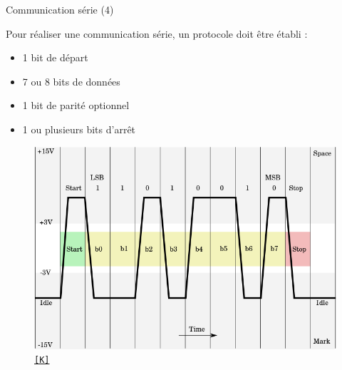 \documentclass[12pt, t]{beamer}
\newcommand{\bi}{\begin{itemize}}
\newcommand{\ei}{\end{itemize}}
\newcommand{\src}[2]{\vspace{-10pt}\caption{\href{#1}{\centering \tt \tiny [#2]}}}
\begin{document}
\begin{frame}{Communication série (4)}

    \vspace{5pt}
    Pour réaliser une communication série, un protocole doit être établi :

    \bi
    \item 1 bit de départ
    \item 7 ou 8 bits de données
    \item 1 bit de parité optionnel
    \item 1 ou plusieurs bits d'arrêt
    \ei

    {
        \begin{figure}
            \centering
            \includegraphics[scale=0.23]{rsr232-k.png}
            \src{https://fr.wikipedia.org/wiki/RS-232\#/media/File:Rs232\_oscilloscope\_trace.svg}{K}
        \end{figure}
    }
\end{frame}
\end{document}
